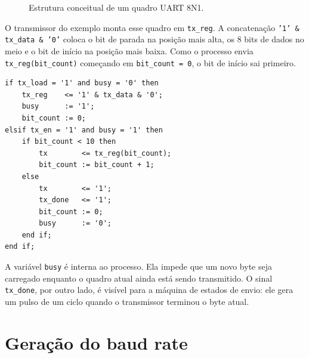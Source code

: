 \documentclass[12pt,a4paper]{book}
\begin{document}
\begin{figure}[h]
\centering
{}
\caption{Estrutura conceitual de um quadro UART 8N1.}
\label{fig:quadro-uart}
\end{figure}

O transmissor do exemplo monta esse quadro em \texttt{tx\_reg}. A concatenação \texttt{'1' \& tx\_data \& '0'} coloca o bit de parada na posição mais alta, os 8 bits de dados no meio e o bit de início na posição mais baixa. Como o processo envia \texttt{tx\_reg(bit\_count)} começando em \texttt{bit\_count = 0}, o bit de início sai primeiro.

\begin{lstlisting}[caption={Núcleo do transmissor UART.}]
if tx_load = '1' and busy = '0' then
    tx_reg    <= '1' & tx_data & '0';
    busy      := '1';
    bit_count := 0;
elsif tx_en = '1' and busy = '1' then
    if bit_count < 10 then
        tx        <= tx_reg(bit_count);
        bit_count := bit_count + 1;
    else
        tx        <= '1';
        tx_done   <= '1';
        bit_count := 0;
        busy      := '0';
    end if;
end if;
\end{lstlisting}

A variável \texttt{busy} é interna ao processo. Ela impede que um novo byte seja carregado enquanto o quadro atual ainda está sendo transmitido. O sinal \texttt{tx\_done}, por outro lado, é visível para a máquina de estados de envio: ele gera um pulso de um ciclo quando o transmissor terminou o byte atual.

\section{Geração do baud rate}
\end{document}
